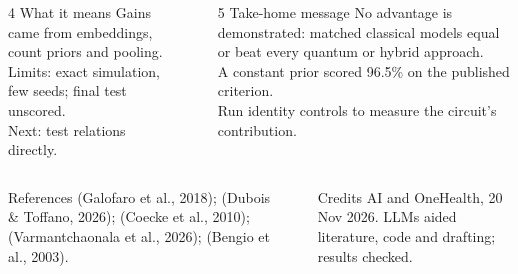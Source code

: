 \documentclass[final]{beamer}
\newlength{\sepwidth}
\newlength{\colwidth}
\newlength{\widecolwidth}
\begin{document}
\begin{frame}[t]
\begin{columns}[t,totalwidth=\textwidth]
  \begin{column}{\colwidth}
    \begin{block}{4 What it means}
      Gains came from embeddings, count priors and pooling.\\[0.35em]
      Limits: exact simulation, few seeds; final test unscored.\\[0.35em]
      Next: test relations directly.
    \end{block}
  \end{column}
  \begin{column}{\sepwidth}\end{column}
  \begin{column}{\widecolwidth}
    \begin{alertblock}{5 Take-home message}
      \fontsize{34}{41}\selectfont
      No advantage is demonstrated: matched classical models equal or beat every quantum or hybrid approach.\\[0.25em]
      A constant prior scored 96.5\% on the published criterion.\\[0.25em]
      Run identity controls to measure the circuit's contribution.
    \end{alertblock}
  \end{column}
\end{columns}

\vspace{1cm plus 1fill}

\begin{columns}[t,totalwidth=\textwidth]
  \begin{column}{\widecolwidth}
    \begin{block}{References}
      \fontsize{20}{24}\selectfont
      (Galofaro et al., 2018); (Dubois \& Toffano, 2026); (Coecke et al., 2010); (Varmantchaonala et al., 2026); (Bengio et al., 2003).
    \end{block}
  \end{column}
  \begin{column}{\sepwidth}\end{column}
  \begin{column}{\colwidth}
    \begin{block}{Credits}
      \fontsize{20}{24}\selectfont
      AI and OneHealth, 20 Nov 2026. LLMs aided literature, code and drafting; results checked.
    \end{block}
  \end{column}
\end{columns}
\end{frame}
\end{document}
